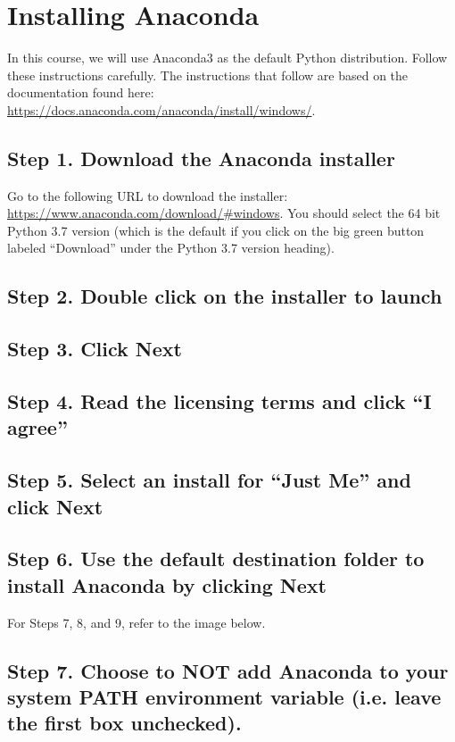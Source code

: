 \documentclass[12pt]{article}
\newcommand{\menu}[1]{{\bf #1}}
\newcommand{\link}[1]{{\small\url{#1}}}
\begin{document}
\section{Installing Anaconda}

In this course, we will use Anaconda3 as the default Python distribution. Follow these instructions carefully.  The instructions that follow are based on the documentation found here:  \url{https://docs.anaconda.com/anaconda/install/windows/}.

\subsection*{Step 1. Download the Anaconda installer}

Go to the following URL to download the installer: \link{https://www.anaconda.com/download/\#windows}.  You should select the 64 bit Python 3.7 version (which is the default if you click on the big green button labeled ``Download'' under the Python 3.7 version heading).

\subsection*{Step 2. Double click on the installer to launch}

\subsection*{Step 3. Click \menu{Next}}

\subsection*{Step 4. Read the licensing terms and click \menu{``I agree''}}

\subsection*{Step 5. Select an install for ``Just Me'' and click \menu{Next}}

\subsection*{Step 6. Use the default destination folder to install Anaconda by clicking \menu{Next}}


For Steps 7, 8, and 9, refer to the image below.

\subsection*{Step 7. Choose to NOT add Anaconda to your system PATH environment variable (i.e. leave the first box unchecked).}
\end{document}
